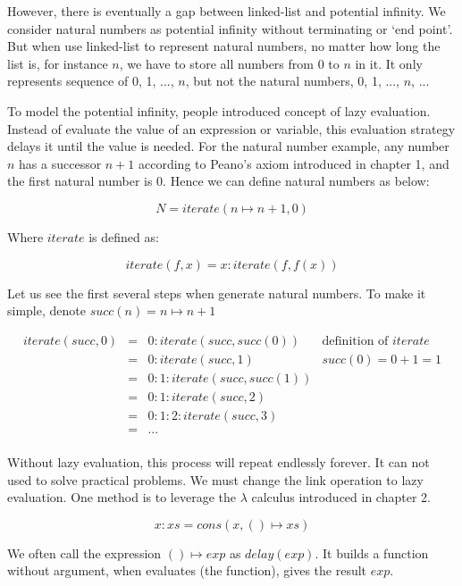 \documentclass{article}
\begin{document}
However, there is eventually a gap between linked-list and potential infinity. We consider natural numbers as potential infinity without terminating or `end point'. But when use linked-list to represent natural numbers, no matter how long the list is, for instance $n$, we have to store all numbers from 0 to $n$ in it. It only represents sequence of 0, 1, ..., $n$, but not the natural numbers, 0, 1, ..., $n$, ...

To model the potential infinity, people introduced concept of lazy evaluation. Instead of evaluate the value of an expression or variable, this evaluation strategy delays it until the value is needed. For the natural number example, any number $n$ has a successor $n+1$ according to Peano's axiom introduced in chapter 1, and the first natural number is 0. Hence we can define natural numbers as below:

\[
N = iterate(n \mapsto n + 1, 0)
\]

Where $iterate$ is defined as:

\[
iterate(f, x) = x : iterate(f, f(x))
\]

Let us see the first several steps when generate natural numbers. To make it simple, denote $succ(n) = n \mapsto n +1$

\[
\begin{array}{rcll}
iterate(succ, 0) & = & 0 : iterate(succ, succ(0)) & \text{definition of } iterate\\
                 & = & 0 : iterate(succ, 1) & succ(0) = 0 + 1 = 1 \\
                 & = & 0 : 1 : iterate(succ, succ(1)) & \\
                 & = & 0 : 1 : iterate(succ, 2) & \\
                 & = & 0 : 1 : 2 : iterate(succ, 3) & \\
                 & = & ... & \\
\end{array}
\]

Without lazy evaluation, this process will repeat endlessly forever. It can not used to solve practical problems. We must change the link operation to lazy evaluation. One method is to leverage the $\lambda$ calculus introduced in chapter 2.

\[
x : xs = cons(x, () \mapsto xs)
\]

We often call the expression $() \mapsto exp$ as $delay(exp)$. It builds a function without argument, when evaluates (the function), gives the result $exp$.
\end{document}
